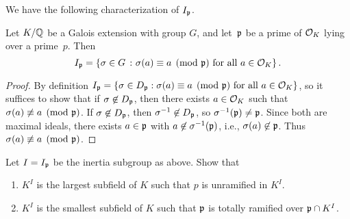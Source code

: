 We have the following characterization of $I_{\mathfrak{p}}$.
\begin{proposition}\label{prop:charip}
	Let $K/\mathbb{Q}$ be a Galois extension with group $G$,
	and let~$\mathfrak{p}$ be a prime of $\mathcal{O}_K$ lying
	over a prime~$p$.  Then
	$$
		I_{\mathfrak{p}} = \left\{
		\sigma\in G \ \colon \sigma(a) \equiv a\pmod{\mathfrak{p}}\text{ for all } a\in\mathcal{O}_K
		\right\}.
	$$
\end{proposition}
\begin{proof}
	By definition $I_{\mathfrak{p}} = \{\sigma\in D_{\mathfrak{p}} : \sigma(a) \equiv
	a\pmod{\mathfrak{p}}\text{ for all } a\in\mathcal{O}_K\}$, so it suffices to show that
	if $\sigma\not\in D_{\mathfrak{p}}$, then there exists $a\in\mathcal{O}_K$ such that
	$\sigma(a)\not\equiv a\pmod{\mathfrak{p}}$.  If $\sigma\not\in D_{\mathfrak{p}}$, then
	$\sigma^{-1}\not\in D_{\mathfrak{p}}$, so $\sigma^{-1}(\mathfrak{p})\neq \mathfrak{p}$.  Since both
	are maximal ideals, there exists $a\in\mathfrak{p}$ with
	$a\not\in\sigma^{-1}(\mathfrak{p})$, i.e., $\sigma(a)\not\in\mathfrak{p}$.  Thus
	$\sigma(a)\not\equiv a\pmod{\mathfrak{p}}$.
\end{proof}

\begin{exercise}
	Let $I = I_{\mathfrak{p}}$ be the inertia subgroup as above. Show that
	\begin{enumerate}
		\item $K^I$ is the largest subfield of $K$ such that $p$ is unramified
		in $K^I$.
		\item $K^I$ is the smallest subfield of $K$ such that $\mathfrak{p}$ is totally
		ramified over $\mathfrak{p} \cap K^I$.
	\end{enumerate}
\end{exercise}

